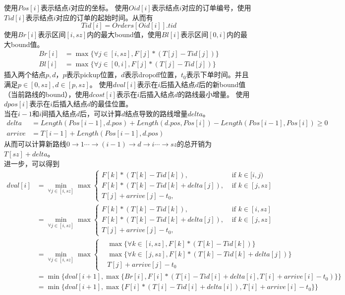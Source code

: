 \documentclass[hyperref,UTF8]{ctexart}
\theoremstyle{definition}
\theoremstyle{remark}
\numberwithin{equation}{subsection}
\begin{document}
使用$Pos[i]$表示结点$i$对应的坐标。
使用$Oid[i]$表示结点$i$对应的订单编号，使用$Tid[i]$表示结点$i$对应的订单的起始时间。从而有
\[
    Tid[i] = Orders[Oid[i]].tid
\]
使用$Br[i]$表示区间$[i,sz]$内的最大bound值，使用$Bl[i]$表示区间$[0,i]$内的最大bound值。
\begin{align*}
    Br[i] &= \max\{\forall j\in[i,sz], F[j]*(T[j] - Tid[j])\} \\
    Bl[i] &= \max\{\forall j\in[0,i], F[j]*(T[j] - Tid[j])\}
\end{align*}
插入两个结点$p,d$，$p$表示pickup位置，$d$表示dropoff位置，$t_0$表示下单时间。并且满足$p \in [0,sz], d \in [p,sz]$。
使用$dval[i]$表示在$i$后插入结点$d$后的新bound值（当前路线的bound），使用$dcost[i]$表示在$i$后插入结点$d$的路线最小增量。
使用$dpos[i]$表示在$i$后插入结点$d$的最佳位置。\\
当在$i-1$和$i$间插入结点$d$后，可以计算$d$结点导致的路线增量$delta$。
\begin{align*}
    delta &= Length(Pos[i-1], d.pos) + Length(d.pos, Pos[i]) - Length(Pos[i-1], Pos[i]) \ge 0 \\
    arrive &= T[i-1] + Length(Pos[i-1], d.pos)
\end{align*}
从而可以计算新路线$0 \rightarrow 1 \cdots \rightarrow (i-1) \rightarrow d \rightarrow i \cdots \rightarrow sz$的总开销为
$T[sz] + delta$。\\
进一步，可以得到
\begin{align*}
    dval[i] &= \min_{\forall j\in[i,sz]}
        \max \left\{
            \begin{aligned}
                F[k]*(T[k]-Tid[k]), &\text{ if } k \in [i,j) \\
                F[k]*(T[k]-Tid[k]+delta[j]), &\text{ if } k \in [j, sz] \\
				T[j] + arrive[j] - t_0, &\text{ }
            \end{aligned}
        \right .    \\
            &= \min_{\forall j\in[i,sz]}
		\max \left\{
            \begin{aligned}
                F[k]*(T[k]-Tid[k]), &\text{ if } k \in [i,sz] \\
                F[k]*(T[k]-Tid[k]+delta[j]), &\text{ if } k \in [j, sz] \\
				T[j] + arrive[j] - t_0, &\text{ }
            \end{aligned}
        \right .    \\
			&= \min_{\forall j\in[i,sz]}
		\max \left\{
			\begin{aligned}
				&\max \{\forall k\in[i,sz], F[k]*(T[k]-Tid[k])\} \\
				&\max \{\forall k\in[j,sz], F[k]*(T[k]-Tid[k]+delta[j])\} \\
				&T[j] + arrive[j] - t_0
			\end{aligned}
		\right . 	\\
			&= \min \{dval[i+1], \max\{Br[i], F[i]*(T[i]-Tid[i]+delta[i], T[i]+arrive[i]-t_0)\} \} \\
			&= \min \{dval[i+1], \max\{F[i]*(T[i]-Tid[i]+delta[i]), T[i]+arrive[i]-t_0\}\} \\
\end{align*}
\end{document}

